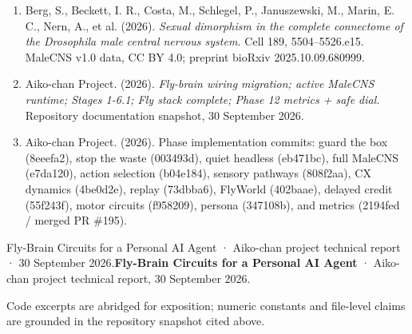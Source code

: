 \documentclass[11pt]{article}
\begin{document}
\begin{enumerate}[leftmargin=*]
\item Berg, S., Beckett, I. R., Costa, M., Schlegel, P., Januszewski, M., Marin, E. C., Nern, A., et al. (2026). \emph{Sexual dimorphism in the complete connectome of the Drosophila male central nervous system.} Cell 189, 5504–5526.e15. MaleCNS v1.0 data, CC BY 4.0; preprint bioRxiv 2025.10.09.680999.
\item Aiko-chan Project. (2026). \emph{Fly-brain wiring migration; active MaleCNS runtime; Stages 1-6.1; Fly stack complete; Phase 12 metrics + safe dial.} Repository documentation snapshot, 30 September 2026.
\item Aiko-chan Project. (2026). Phase implementation commits: guard the box (8eeefa2), stop the waste (003493d), quiet headless (eb471bc), full MaleCNS (e7da120), action selection (b04e184), sensory pathways (808f2aa), CX dynamics (4be0d2e), replay (73dbba6), FlyWorld (402baae), delayed credit (55f243f), motor circuits (f958209), persona (347108b), and metrics (2194fed / merged PR \#195).
\end{enumerate}

Fly-Brain Circuits for a Personal AI Agent · Aiko-chan project technical report · 30 September 2026.\textbf{Fly-Brain Circuits for a Personal AI Agent} · Aiko-chan project technical report, 30 September 2026.

Code excerpts are abridged for exposition; numeric constants and file-level claims are grounded in the repository snapshot cited above.
\end{document}
